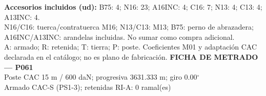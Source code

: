 \begingroup\scriptsize
\textbf{Accesorios incluidos (ud):} B75: 4; N16: 23; A16INC: 4; C16: 7; N13: 4; C13: 4; A13INC: 4.\\
N16/C16: tuerca/contratuerca M16; N13/C13: M13; B75: perno de abrazadera; A16INC/A13INC: arandelas incluidas. No sumar como compra adicional.\\
A: armado; R: retenida; T: tierra; P: poste. Coeficientes M01 y adaptación CAC declarada en el catálogo; no es plano de fabricación.
\endgroup\endgroup
\clearpage{}
\begingroup\small\setlength{\parskip}{3pt}\renewcommand{\arraystretch}{1.05}
\textbf{\large FICHA DE METRADO — P061}\\[4pt]
Poste CAC 15 m / 600 daN; progresiva 3631.333 m; giro 0.00\ensuremath{^\circ}\\
Armado CAC-S (PS1-3); retenidas RI-A: 0 ramal(es)\\
\begingroup\scriptsize

